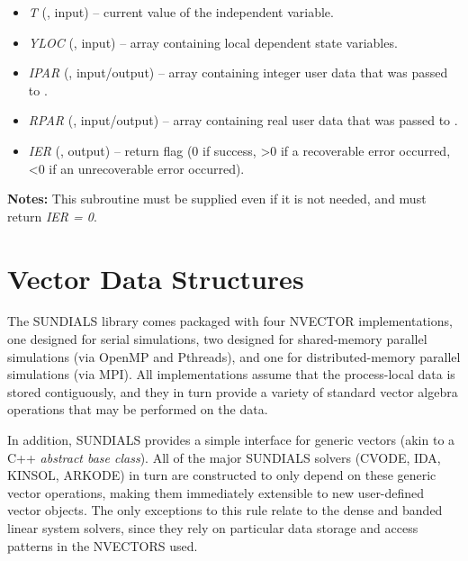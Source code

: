 \documentclass[letterpaper,10pt,english]{sphinxmanual}
\begin{document}
\begin{enumerate}
\begin{fulllineitems}
\begin{description}
\begin{itemize}
\item {} 
\emph{T} (, input) -- current value of the
independent variable.

\item {} 
\emph{YLOC} (, input) -- array containing local
dependent state variables.

\item {} 
\emph{IPAR} (, input/output) -- array containing
integer user data that was passed to
{\hyperref[f_interface/Usage:f/_/FARKMALLOC]{\emph{}}}.

\item {} 
\emph{RPAR} (, input/output) -- array containing
real user data that was passed to {\hyperref[f_interface/Usage:f/_/FARKMALLOC]{\emph{}}}.

\item {} 
\emph{IER} (, output) -- return flag (0 if success, \textgreater{}0
if a recoverable error occurred, \textless{}0 if an unrecoverable
error occurred).

\end{itemize}

\end{description}

\textbf{Notes:}
This subroutine must be supplied even if it is not needed, and
must return \emph{IER = 0}.

\end{fulllineitems}


\end{enumerate}


\chapter{Vector Data Structures}
\label{nvectors/index:nvectors}\label{nvectors/index::doc}\label{nvectors/index:vector-data-structures}
The SUNDIALS library comes packaged with four NVECTOR implementations,
one designed for serial simulations, two designed for shared-memory
parallel simulations (via OpenMP and Pthreads), and one for
distributed-memory parallel simulations (via MPI).  All
implementations assume that the process-local data is stored
contiguously, and they in turn provide a variety of standard vector
algebra operations that may be performed on the data.

In addition, SUNDIALS provides a simple interface for generic vectors
(akin to a C++ \emph{abstract base class}).  All of the major SUNDIALS
solvers (CVODE, IDA, KINSOL, ARKODE) in turn are constructed to only
depend on these generic vector operations, making them immediately
extensible to new user-defined vector objects.  The only exceptions to
this rule relate to the dense and banded linear system solvers, since
they rely on particular data storage and access patterns in the
NVECTORS used.
\end{document}

